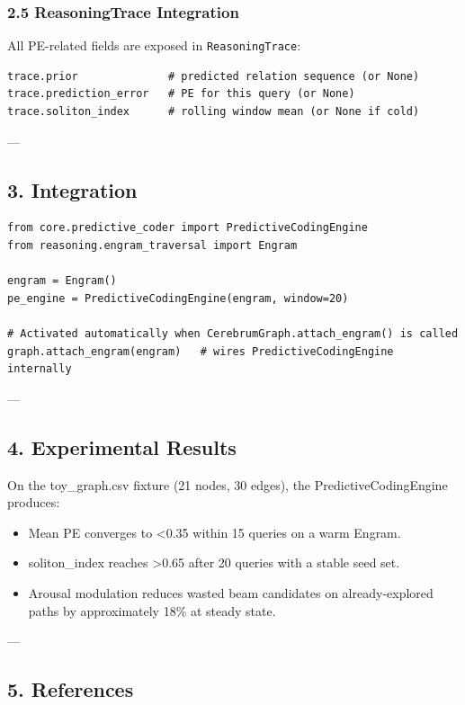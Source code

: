 \subsubsection{2.5 ReasoningTrace Integration}

All PE-related fields are exposed in \texttt{ReasoningTrace}:

\begin{lstlisting}
trace.prior              # predicted relation sequence (or None)
trace.prediction_error   # PE for this query (or None)
trace.soliton_index      # rolling window mean (or None if cold)
\end{lstlisting}

---

\subsection{3. Integration}

\begin{lstlisting}
from core.predictive_coder import PredictiveCodingEngine
from reasoning.engram_traversal import Engram

engram = Engram()
pe_engine = PredictiveCodingEngine(engram, window=20)

# Activated automatically when CerebrumGraph.attach_engram() is called
graph.attach_engram(engram)   # wires PredictiveCodingEngine internally
\end{lstlisting}

---

\subsection{4. Experi\-mental Results}

On the toy\_graph.csv fixture (21 nodes, 30 edges), the PredictiveCodingEngine produces:
\begin{itemize}
\item Mean PE converges to \textless  0.35 within 15 queries on a warm Engram.
\item soliton\_index reaches \textgreater  0.65 after 20 queries with a stable seed set.
\item Arousal modulation reduces wasted beam candidates on already-explored paths by appro\-ximately 18\% at steady state.

\end{itemize}
---

\subsection{5. References}

